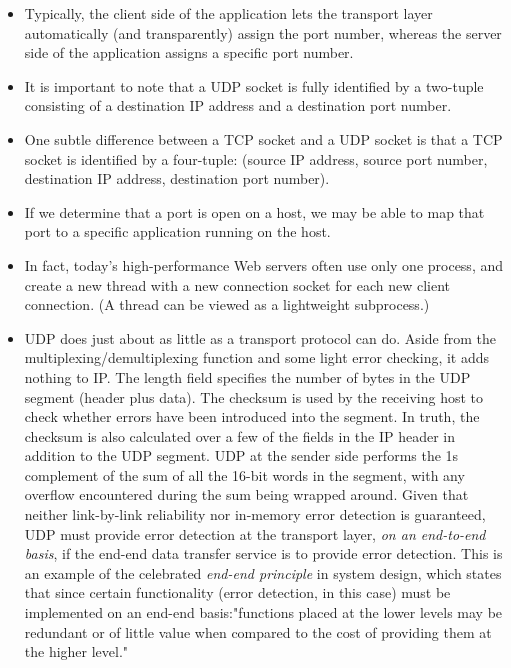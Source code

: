 \begin{itemize}
\item
Typically, the client side of the application lets the transport layer automatically (and transparently) assign the port number, whereas the server side of the application assigns a specific port number.

\item
It is important to note that a UDP socket is fully identified by a two-tuple consisting of a destination IP address and a destination port number.

\item
One subtle difference between a TCP socket and a UDP socket is that a TCP socket is identified by a four-tuple: (source IP address, source port number, destination IP address, destination port number).

\item
If we determine that a port is open on a host, we may be able to map that port to a specific application running on the host.

\item
In fact, today's high-performance Web servers often use only one process, and create a new thread with a new connection socket for each new client connection. (A thread can be viewed as a lightweight subprocess.)

\item
UDP does just about as little as a transport protocol can do. Aside from the multiplexing/demultiplexing function and some light error checking, it adds nothing to IP.
The length field specifies the number of bytes in the UDP segment (header plus data).
The checksum is used by the receiving host to check whether errors have been introduced into the segment. In truth, the checksum is also calculated over a few of the fields in the IP header in addition to the UDP segment.
UDP at the sender side performs the 1s complement of the sum of all the 16-bit words in the segment, with any overflow encountered during the sum being wrapped around.
Given that neither link-by-link reliability nor in-memory error detection is guaranteed, UDP must provide error detection at the transport layer, \textit{on an end-to-end basis}, if the end-end data transfer service is to provide error detection. This is an example of the celebrated \textit{end-end principle} in system design, which states that since certain functionality (error detection, in this case) must be implemented on an end-end basis:"functions placed at the lower levels may be redundant or of little value when compared to the cost of providing them at the higher level."


\end{itemize}
